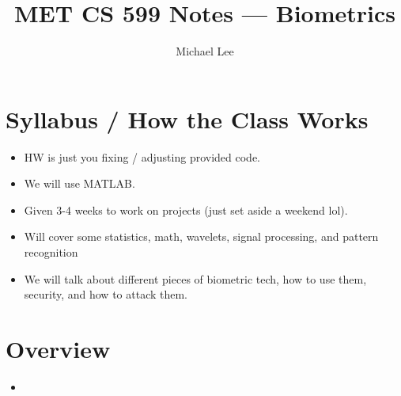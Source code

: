 \documentclass[11pt]{article}
\title{MET CS 599 Notes — Biometrics}
\author{Michael Lee}
\date{}
\begin{document}
\maketitle
\tableofcontents
\newpage

\section{Syllabus / How the Class Works}
\begin{itemize}
    \item HW is just you fixing / adjusting provided code.
    \item We will use MATLAB.
    \item Given 3-4 weeks to work on projects (just set aside a weekend lol).
    \item Will cover some statistics, math, wavelets, signal processing, and pattern recognition
    \item We will talk about different pieces of biometric tech, how to use them, security, and how to attack them.
\end{itemize}

\section{Overview}
\begin{itemize}
    \item 
\end{itemize}
\end{document}
